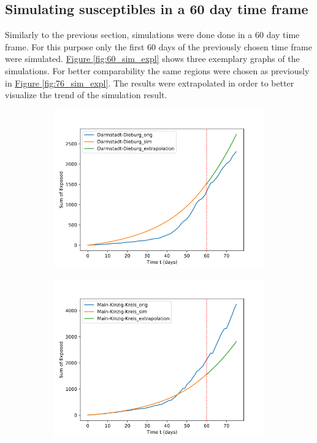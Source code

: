 \subsection{Simulating susceptibles in a 60 day time frame}
Similarly to the previous section, simulations were done done in a 60 day time frame. For this purpose only the first
60 days of the previously chosen time frame were simulated. \hyperref[fig:60_sim_expl]{Figure \ref*{fig:60_sim_expl}}
shows three exemplary graphs of the simulations. For better comparability the same regions were chosen as previously
in \hyperref[fig:76_sim_expl]{Figure \ref*{fig:76_sim_expl}}. The results were extrapolated in order to better visualize
the trend of the simulation result.

\begin{figure}
	\centering
	\begin{subfigure}[b]{0.3\textwidth}
		\centering
		\includegraphics[width=\textwidth]{./figures/60d/24_Darmstadt-Dieburg.png}	
		\caption{}
	\end{subfigure}
	\hfill
	\begin{subfigure}[b]{0.3\textwidth}
		\centering
		\includegraphics[width=\textwidth]{./figures/60d/13_Main-Kinzig-Kreis.png}	

\end{subfigure}
\end{figure}
